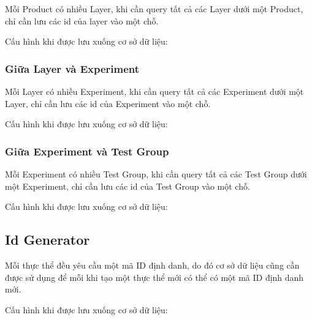 Mỗi Product có nhiều Layer, khi cần query tất cả các Layer dưới một Product, chỉ cần lưu
các id của layer vào một chỗ.

Cấu hình khi được lưu xuống cơ sở dữ liệu:

\begin{itemize}
\end{itemize}

\subsubsection{Giữa Layer và Experiment}

Mỗi Layer có nhiều Experiment, khi cần query tất cả các Experiment dưới một Layer, chỉ cần lưu
các id của Experiment vào một chỗ.

Cấu hình khi được lưu xuống cơ sở dữ liệu:

\begin{itemize}
\end{itemize}

\subsubsection{Giữa Experiment và Test Group}

Mỗi Experiment có nhiều Test Group, khi cần query tất cả các Test Group dưới một Experiment, chỉ cần lưu
các id của Test Group vào một chỗ.

Cấu hình khi được lưu xuống cơ sở dữ liệu:

\begin{itemize}
\end{itemize}

\subsection{Id Generator}

Mỗi thực thể đều yêu cầu một mã ID định danh, do đó cơ sở dữ liệu cũng cần được sử dụng để mỗi
khi tạo một thực thể mới có thể có một mã ID định danh mới.

Cấu hình khi được lưu xuống cơ sở dữ liệu:

\begin{itemize}
\end{itemize}
